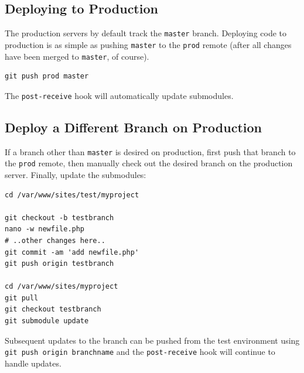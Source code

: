 \documentclass[pdflatex,letterpaper,twoside,12pt]{book}
\begin{document}


\subsection{Deploying to Production}

The production servers by default track the \texttt{master} branch.  Deploying code to production is as simple as pushing \texttt{master} to the \texttt{prod} remote (after all changes have been merged to \texttt{master}, of course).

\begin{lstlisting}
git push prod master
\end{lstlisting}

The \texttt{post-receive} hook will automatically update submodules.

\subsection{Deploy a Different Branch on Production}

If a branch other than \texttt{master} is desired on production, first push that branch to the \texttt{prod} remote, then manually check out the desired branch on the production server.  Finally, update the submodules:

\begin{lstlisting}
cd /var/www/sites/test/myproject

git checkout -b testbranch
nano -w newfile.php
# ..other changes here..
git commit -am 'add newfile.php'
git push origin testbranch

cd /var/www/sites/myproject
git pull
git checkout testbranch
git submodule update
\end{lstlisting}

Subsequent updates to the branch can be pushed from the test environment using \texttt{git push origin branchname} and the \texttt{post-receive} hook will continue to handle updates.
\end{document}
